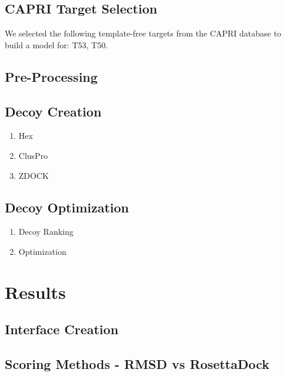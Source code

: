 \documentclass{article}
\begin{document}
\subsection{CAPRI Target Selection}

We selected the following template-free targets from the CAPRI database to build a model for: T53, T50.

\subsection{Pre-Processing}

\subsection{Decoy Creation}

\begin{enumerate}

\item Hex

\item ClusPro

\item ZDOCK

\end{enumerate}

\subsection{Decoy Optimization}

\begin{enumerate}

\item Decoy Ranking

\item Optimization

\end{enumerate}



\section{Results}

\subsection{Interface Creation}

\subsection{Scoring Methods - RMSD vs RosettaDock}
\end{document}
